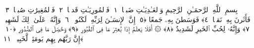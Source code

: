 
  
    
  
    
    

\nopagebreak
  بِسمِ ٱللَّهِ ٱلرَّحمَـٰنِ ٱلرَّحِيمِ
  وَٱلعَـٰدِيَـٰتِ ضَبحًۭا ﴿١﴾
 فَٱلمُورِيَـٰتِ قَدحًۭا ﴿٢﴾
 فَٱلمُغِيرَٰتِ صُبحًۭا ﴿٣﴾
 فَأَثَرنَ بِهِۦ نَقعًۭا ﴿٤﴾
 فَوَسَطنَ بِهِۦ جَمعًا ﴿٥﴾
 إِنَّ ٱلإِنسَـٰنَ لِرَبِّهِۦ لَكَنُودٌۭ ﴿٦﴾
 وَإِنَّهُۥ عَلَىٰ ذَٟلِكَ لَشَهِيدٌۭ ﴿٧﴾
 وَإِنَّهُۥ لِحُبِّ ٱلخَيرِ لَشَدِيدٌ ﴿٨﴾
 ۞ أَفَلَا يَعلَمُ إِذَا بُعثِرَ مَا فِى ٱلقُبُورِ ﴿٩﴾
 وَحُصِّلَ مَا فِى ٱلصُّدُورِ ﴿١٠﴾
 إِنَّ رَبَّهُم بِهِم يَومَئِذٍۢ لَّخَبِيرٌۢ ﴿١١﴾
 
